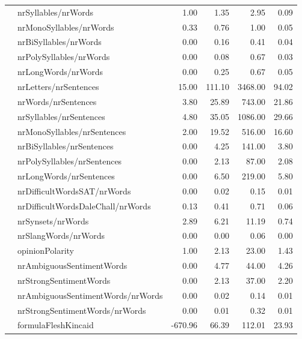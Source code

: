 \begin{tabular}{|l|l|r|r|r|r|}
 & nrSyllables/nrWords & 1.00 & 1.35 & 2.95 & 0.09 \\ \cline{2-6}
 & nrMonoSyllables/nrWords & 0.33 & 0.76 & 1.00 & 0.05 \\ \cline{2-6}
 & nrBiSyllables/nrWords & 0.00 & 0.16 & 0.41 & 0.04 \\ \cline{2-6}
 & nrPolySyllables/nrWords & 0.00 & 0.08 & 0.67 & 0.03 \\ \cline{2-6}
 & nrLongWords/nrWords & 0.00 & 0.25 & 0.67 & 0.05 \\ \hline
\parbox[t]{2mm}{} & nrLetters/nrSentences & 15.00 & 111.10 & 3468.00 & 94.02 \\ 
 & nrWords/nrSentences & 3.80 & 25.89 & 743.00 & 21.86 \\ 
 & nrSyllables/nrSentences & 4.80 & 35.05 & 1086.00 & 29.66 \\ 
 & nrMonoSyllables/nrSentences & 2.00 & 19.52 & 516.00 & 16.60 \\ 
 & nrBiSyllables/nrSentences & 0.00 & 4.25 & 141.00 & 3.80 \\ 
 & nrPolySyllables/nrSentences & 0.00 & 2.13 & 87.00 & 2.08 \\ 
 & nrLongWords/nrSentences & 0.00 & 6.50 & 219.00 & 5.80 \\ \hline
\parbox[t]{2mm}{} & nrDifficultWordsSAT/nrWords & 0.00 & 0.02 & 0.15 & 0.01 \\ 
 & nrDifficultWordsDaleChall/nrWords & 0.13 & 0.41 & 0.71 & 0.06 \\ 
 & nrSynsets/nrWords & 2.89 & 6.21 & 11.19 & 0.74 \\ 
 & nrSlangWords/nrWords & 0.00 & 0.00 & 0.06 & 0.00 \\ \hline
\parbox[t]{2mm}{} & opinionPolarity & 1.00 & 2.13 & 23.00 & 1.43 \\ 
 & nrAmbiguousSentimentWords & 0.00 & 4.77 & 44.00 & 4.26 \\ 
 & nrStrongSentimentWords & 0.00 & 2.13 & 37.00 & 2.20 \\ 
 & nrAmbiguousSentimentWords/nrWords & 0.00 & 0.02 & 0.14 & 0.01 \\ 
 & nrStrongSentimentWords/nrWords & 0.00 & 0.01 & 0.32 & 0.01 \\ \hline
\parbox[t]{2mm}{} & formulaFleshKincaid & -670.96 & 66.39 & 112.01 & 23.93 \\ 

\end{tabular}
